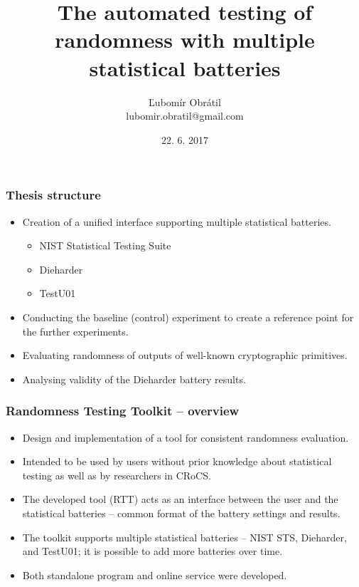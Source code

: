 \documentclass[aspectratio=169]{beamer}
\title[Randomness Testing Toolkit]{The automated testing of randomness with multiple statistical batteries} %
\author[lubomir.obratil@gmail.com]{Ľubomír Obrátil\\lubomir.obratil@gmail.com} %
\date{22. 6. 2017} %
\begin{document}
\begin{frame}
\titlepage %
\end{frame}

\begin{frame}
\frametitle{Thesis structure}

\begin{itemize}
\item Creation of a unified interface supporting multiple statistical batteries.
\begin{itemize}
\item NIST Statistical Testing Suite
\item Dieharder
\item TestU01
\end{itemize}
\item Conducting the baseline (control) experiment to create a reference point for the further experiments.
\item Evaluating randomness of outputs of well-known cryptographic primitives.
\item Analysing validity of the Dieharder battery results.
\end{itemize}

\end{frame}

\begin{frame}
\frametitle{Randomness Testing Toolkit -- overview}
\begin{itemize}
\item Design and implementation of a tool for consistent randomness evaluation.
\item Intended to be used by users without prior knowledge about statistical testing as well as by researchers in CRoCS. 
\item The developed tool (RTT) acts as an interface between the user and the statistical batteries -- common format of the battery settings and results.
\item The toolkit supports multiple statistical batteries -- NIST STS, Dieharder, and TestU01; it is possible to add more batteries over time.
\item Both standalone program and online service were developed.
\end{itemize}
\end{frame}
\end{document}
